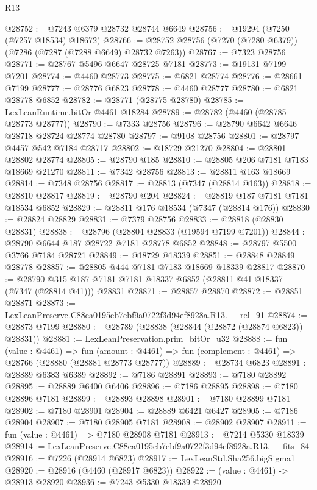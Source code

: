 \begin{lexlean}{R13}
\begin{coremodule}
@28752 := @7243 @6379 @28732 @28744 @6649
@28756 := @19294 (@7250 (@7257 @18534) @18672)
@28766 := @28752 @28756 (@7270 (@7280 @6379)) (@7286 (@7287 (@7288 @6649) @28732 @7263))
@28767 := @7323 @28756
@28771 := @28767 @5496 @6647 @28725 @7181
@28773 := @19131 @7199 @7201
@28774 := @4460 @28773
@28775 := @6821 @28774
@28776 := @28661 @7199
@28777 := @28776 @6823
@28778 := @4460 @28777
@28780 := @6821 @28778 @6852
@28782 := @28771 (@28775 @28780)
@28785 := LexLeanRuntime.bitOr @4461 @18284
@28789 := @28782 (@4460 (@28785 @28773 @28777))
@28790 := @7333 @28756
@28796 := @28790 @6642 @6646 @28718 @28724 @28774 @28780
@28797 := @9108 @28756
@28801 := @28797 @4457 @542 @7184 @28717
@28802 := @18729 @21270
@28804 := @28801 @28802 @28774
@28805 := @28790 @185
@28810 := @28805 @206 @7181 @7183 @18669 @21270
@28811 := @7342 @28756
@28813 := @28811 @163 @18669
@28814 := @7348 @28756
@28817 := @28813 (@7347 (@28814 @163))
@28818 := @28810 @28817
@28819 := @28790 @204
@28824 := @28819 @187 @7181 @7181 @18534 @6852
@28829 := @28811 @176 @18534 (@7347 (@28814 @176))
@28830 := @28824 @28829
@28831 := @7379 @28756
@28833 := @28818 (@28830 @28831)
@28838 := @28796 (@28804 @28833 (@19594 @7199 @7201))
@28844 := @28790 @6644 @187 @28722 @7181 @28778 @6852
@28848 := @28797 @5500 @3766 @7184 @28721
@28849 := @18729 @18339
@28851 := @28848 @28849 @28778
@28857 := @28805 @444 @7181 @7183 @18669 @18339 @28817
@28870 := @28790 @315 @187 @7181 @7181 @18337 @6852 (@28811 @41 @18337 (@7347 (@28814 @41))) @28831
@28871 := @28857 @28870
@28872 := @28851 @28871
@28873 := LexLeanPreserve.C88ea0195eb7ebf9a0722f3d94ef8928a.R13.__rel_91
@28874 := @28873 @7199
@28880 := @28789 (@28838 (@28844 (@28872 (@28874 @6823)) @28831))
@28881 := LexLeanPreservation.prim_bitOr_u32
@28888 := fun (value : @4461) =>
  fun (amount : @4461) => fun (complement : @4461) => @28766 (@28880 (@28881 @28773 @28777))
@28889 := @28734 @6823
@28891 := @28889 @6383 @6389
@28892 := @7186 @28891
@28893 := @7180 @28892
@28895 := @28889 @6400 @6406
@28896 := @7186 @28895
@28898 := @7180 @28896 @7181
@28899 := @28893 @28898
@28901 := @7180 @28899 @7181
@28902 := @7180 @28901
@28904 := @28889 @6421 @6427
@28905 := @7186 @28904
@28907 := @7180 @28905 @7181
@28908 := @28902 @28907
@28911 := fun (value : @4461) => @7180 @28908 @7181
@28913 := @7214 @5330 @18339
@28914 := LexLeanPreserve.C88ea0195eb7ebf9a0722f3d94ef8928a.R13.__fits_84
@28916 := @7226 (@28914 @6823)
@28917 := LexLeanStd.Sha256.bigSigma1
@28920 := @28916 (@4460 (@28917 @6823))
@28922 := (value : @4461) -> @28913 @28920
@28936 := @7243
    @5330
    @18339
    @28920

\end{coremodule}
\end{lexlean}
